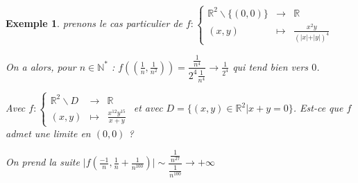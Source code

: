 \documentclass[a4paper,12pt]{book}
\newtheorem{Exe}{Exemple}[section]
\def\R{\mathbb{R}}
\def\N{\mathbb{N}}
\begin{document}
\begin{Exe}
\par prenons le cas particulier de $f:\left\{\begin{array}{rcl} \R^2\backslash\{(0,0)\} & \to & \R \\ (x,y) & \mapsto & \frac{x^2 y}{(\vert x\vert+\vert y\vert)^4} \end{array}\right.$ \par On a alors, pour $n\in\N^*$ : $f\left(\left(\frac{1}{n},\frac{1}{n^2}\right)\right)=\dfrac{\frac{1}{n^4}}{2^4\frac{1}{n^4}}\to\frac{1}{2^4}$ qui tend bien vers $0$.
\par Avec $f:\left\{\begin{array}{rcl} \R^2\backslash D & \to & \R \\ (x,y) & \mapsto & \frac{x^{12}y^{15}}{x+y} \end{array}\right.$ et avec $D=\{(x,y)\in\R^2\vert x+y=0\}$. Est-ce que $f$ admet une limite en $(0,0)$ ? \par On prend la suite $\vert f\left(\frac{-1}{n}, \frac{1}{n}+\frac{1}{n^{100}}\right)\vert\sim\dfrac{\frac{1}{n^{27}}}{\frac{1}{n^{100}}}\to+\infty$
\end{Exe}
\end{document}
